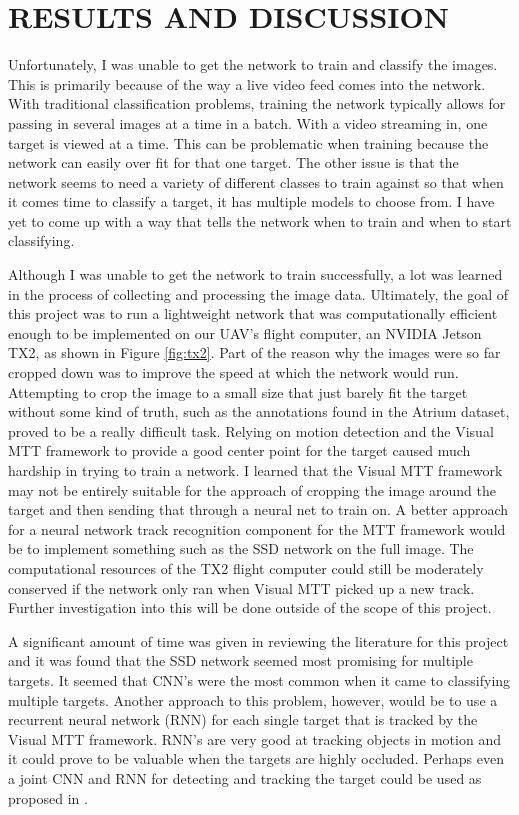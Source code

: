 \documentclass[letterpaper, 10 pt, conference]{ieeeconf}  %
\begin{document}
\section{RESULTS AND DISCUSSION} \label{RESULTS}

Unfortunately, I was unable to get the network to train and classify the images. This is primarily because of the way a live video feed comes into the network. With traditional classification problems, training the network typically allows for passing in several images at a time in a batch. With a video streaming in, one target is viewed at a time. This can be problematic when training because the network can easily over fit for that one target. The other issue is that the network seems to need a variety of different classes to train against so that when it comes time to classify a target, it has multiple models to choose from. I have yet to come up with a way that tells the network when to train and when to start classifying. 

Although I was unable to get the network to train successfully, a lot was learned in the process of collecting and processing the image data. Ultimately, the goal of this project was to run a lightweight network that was computationally efficient enough to be implemented on our UAV's flight computer, an NVIDIA Jetson TX2, as shown in Figure \ref{fig:tx2}. Part of the reason why the images were so far cropped down was to improve the speed at which the network would run. Attempting to crop the image to a small size that just barely fit the target without some kind of truth, such as the annotations found in the Atrium dataset, proved to be a really difficult task. Relying on motion detection and the Visual MTT framework to provide a good center point for the target caused much hardship in trying to train a network. I learned that the Visual MTT framework may not be entirely suitable for the approach of cropping the image around the target and then sending that through a neural net to train on. A better approach for a neural network track recognition component for the MTT framework would be to implement something such as the SSD network on the full image. The computational resources of the TX2 flight computer could still be moderately conserved if the network only ran when Visual MTT picked up a new track. Further investigation into this will be done outside of the scope of this project.

A significant amount of time was given in reviewing the literature for this project and it was found that the SSD network seemed most promising for multiple targets. It seemed that CNN's were the most common when it came to classifying multiple targets. Another approach to this problem, however, would be to use a recurrent neural network (RNN) for each single target that is tracked by the Visual MTT framework. RNN's are very good at tracking objects in motion and it could prove to be valuable when the targets are highly occluded. Perhaps even a joint CNN and RNN for detecting and tracking the target could be used as proposed in \cite{fangtrack}.
\end{document}
